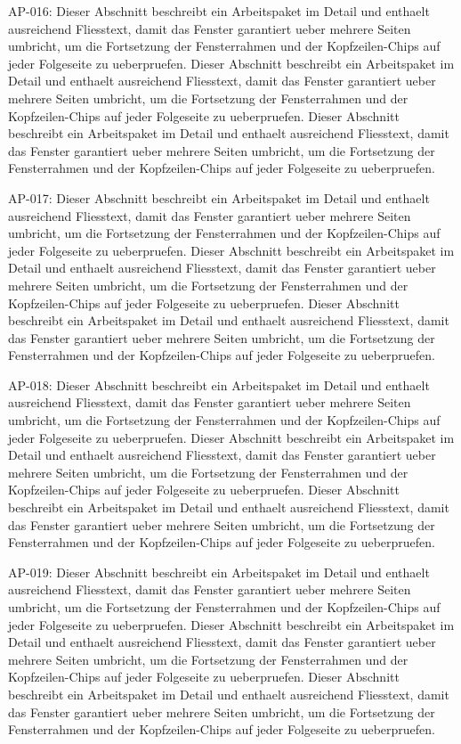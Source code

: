 \documentclass[type=report,theme=light,language=de]{semio}
\begin{document}
\begin{Table}[title=Lange Tabelle]
AP-016: Dieser Abschnitt beschreibt ein Arbeitspaket im Detail und enthaelt ausreichend Fliesstext, damit das Fenster garantiert ueber mehrere Seiten umbricht, um die Fortsetzung der Fensterrahmen und der Kopfzeilen-Chips auf jeder Folgeseite zu ueberpruefen. Dieser Abschnitt beschreibt ein Arbeitspaket im Detail und enthaelt ausreichend Fliesstext, damit das Fenster garantiert ueber mehrere Seiten umbricht, um die Fortsetzung der Fensterrahmen und der Kopfzeilen-Chips auf jeder Folgeseite zu ueberpruefen. Dieser Abschnitt beschreibt ein Arbeitspaket im Detail und enthaelt ausreichend Fliesstext, damit das Fenster garantiert ueber mehrere Seiten umbricht, um die Fortsetzung der Fensterrahmen und der Kopfzeilen-Chips auf jeder Folgeseite zu ueberpruefen. 

AP-017: Dieser Abschnitt beschreibt ein Arbeitspaket im Detail und enthaelt ausreichend Fliesstext, damit das Fenster garantiert ueber mehrere Seiten umbricht, um die Fortsetzung der Fensterrahmen und der Kopfzeilen-Chips auf jeder Folgeseite zu ueberpruefen. Dieser Abschnitt beschreibt ein Arbeitspaket im Detail und enthaelt ausreichend Fliesstext, damit das Fenster garantiert ueber mehrere Seiten umbricht, um die Fortsetzung der Fensterrahmen und der Kopfzeilen-Chips auf jeder Folgeseite zu ueberpruefen. Dieser Abschnitt beschreibt ein Arbeitspaket im Detail und enthaelt ausreichend Fliesstext, damit das Fenster garantiert ueber mehrere Seiten umbricht, um die Fortsetzung der Fensterrahmen und der Kopfzeilen-Chips auf jeder Folgeseite zu ueberpruefen. 

AP-018: Dieser Abschnitt beschreibt ein Arbeitspaket im Detail und enthaelt ausreichend Fliesstext, damit das Fenster garantiert ueber mehrere Seiten umbricht, um die Fortsetzung der Fensterrahmen und der Kopfzeilen-Chips auf jeder Folgeseite zu ueberpruefen. Dieser Abschnitt beschreibt ein Arbeitspaket im Detail und enthaelt ausreichend Fliesstext, damit das Fenster garantiert ueber mehrere Seiten umbricht, um die Fortsetzung der Fensterrahmen und der Kopfzeilen-Chips auf jeder Folgeseite zu ueberpruefen. Dieser Abschnitt beschreibt ein Arbeitspaket im Detail und enthaelt ausreichend Fliesstext, damit das Fenster garantiert ueber mehrere Seiten umbricht, um die Fortsetzung der Fensterrahmen und der Kopfzeilen-Chips auf jeder Folgeseite zu ueberpruefen. 

AP-019: Dieser Abschnitt beschreibt ein Arbeitspaket im Detail und enthaelt ausreichend Fliesstext, damit das Fenster garantiert ueber mehrere Seiten umbricht, um die Fortsetzung der Fensterrahmen und der Kopfzeilen-Chips auf jeder Folgeseite zu ueberpruefen. Dieser Abschnitt beschreibt ein Arbeitspaket im Detail und enthaelt ausreichend Fliesstext, damit das Fenster garantiert ueber mehrere Seiten umbricht, um die Fortsetzung der Fensterrahmen und der Kopfzeilen-Chips auf jeder Folgeseite zu ueberpruefen. Dieser Abschnitt beschreibt ein Arbeitspaket im Detail und enthaelt ausreichend Fliesstext, damit das Fenster garantiert ueber mehrere Seiten umbricht, um die Fortsetzung der Fensterrahmen und der Kopfzeilen-Chips auf jeder Folgeseite zu ueberpruefen. 


\end{Table}
\end{document}
